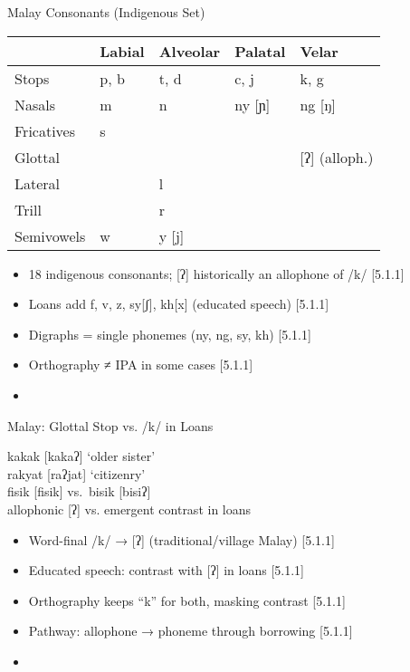 \documentclass{beamer}
\newcommand{\booksrc}[1]{\hfill {\tiny [#1]}}
\begin{document}

\begin{frame}{Malay Consonants (Indigenous Set)}
\begin{tabular}{lllll}
 & Labial & Alveolar & Palatal & Velar \\
\hline
Stops & p, b & t, d & c, j & k, g \\
Nasals & m & n & ny [ɲ] & ng [ŋ] \\
Fricatives & s &  &  &  \\
Glottal &  &  &  & [ʔ] (alloph.) \\
Lateral &  & l &  &  \\
Trill &  & r &  &  \\
Semivowels & w & y [j] &  &  \\
\end{tabular}
\begin{itemize}
\item 18 indigenous consonants; [ʔ] historically an allophone of /k/ \booksrc{5.1.1}
\item Loans add f, v, z, sy[ʃ], kh[x] (educated speech) \booksrc{5.1.1}
\item Digraphs = single phonemes (ny, ng, sy, kh) \booksrc{5.1.1}
\item Orthography ≠ IPA in some cases \booksrc{5.1.1}
\item %
\end{itemize}
\end{frame}

\begin{frame}{Malay: Glottal Stop vs. /k/ in Loans}
\begin{exe}
\ex kakak [kakaʔ] \quad ‘older sister’ \\
\ex rakyat [raʔjat] \quad ‘citizenry’ \\
\ex fisik [fisik] \quad vs.\ bisik [bisiʔ] \\
\trans allophonic [ʔ] vs. emergent contrast in loans
\end{exe}
\begin{itemize}
\item Word-final /k/ → [ʔ] (traditional/village Malay) \booksrc{5.1.1}
\item Educated speech: contrast with [ʔ] in loans \booksrc{5.1.1}
\item Orthography keeps “k” for both, masking contrast \booksrc{5.1.1}
\item Pathway: allophone → phoneme through borrowing \booksrc{5.1.1}
\item %
\end{itemize}
\end{frame}
\end{document}
